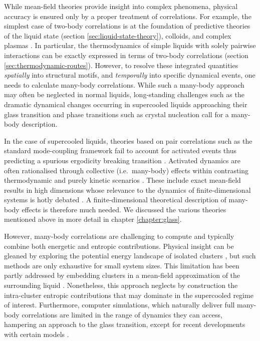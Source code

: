 \documentclass[11pt,twoside]{report}
\begin{document}
While mean-field theories provide insight into complex phenomena, physical accuracy is ensured only by a proper treatment of correlations.
For example, the simplest case of two-body correlations is at the foundation of predictive theories of the liquid state (section \ref{sec:liquid-state-theory}), colloids, and complex plasmas \cite{LikosPR2001,Ivlev2012}.
In particular, the thermodynamics of simple liquids with solely pairwise interactions can be exactly expressed in terms of two-body correlations (section \ref{sec:thermodynamic-routes}).
However, to resolve these integrated quantities \emph{spatially} into structural motifs, and \emph{temporally} into specific dynamical events, one needs to calculate many-body correlations.
While such a many-body approach may often be neglected in normal liquids, long-standing challenges such as the dramatic dynamical changes occurring in supercooled liquids approaching their glass transition \cite{BerthierRMP2011,RoyallPR2015} and phase transitions such as crystal nucleation \cite{RussoSR2012} call for a many-body description.

In the case of supercooled liquids, theories based on pair correlations such as the standard mode-coupling framework \cite{Gotze2009} fail to account for activated events thus predicting a spurious ergodicity breaking transition \cite{BrambillaPRL2009,HallettNC2018}.
Activated dynamics are often rationalised through collective (i.e.\ many-body) effects within contrasting thermodynamic and purely kinetic scenarios \cite{LubchenkoARPC2007,TarjusJPCM2005,BiroliPRL2006,JanssenPRL2015,SzamelPTEP2013,ChandlerARPC2010}.
These include exact mean-field results in high dimensions \cite{ParisiRMP2010,CharbonneauARCMP2017} whose relevance to the dynamics of finite-dimensional systems is hotly debated \cite{WyartPRL2017}.
A finite-dimensional theoretical description of many-body effects is therefore much needed.
We discussed the various theories mentioned above in more detail in chapter \ref{chapter:glass}.

However, many-body correlations are challenging to compute and typically combine both energetic and entropic contributions.
Physical insight can be gleaned by exploring the potential energy landscape of isolated clusters \cite{Wales2004,ArkusPRL2009}, but such methods are only exhaustive for small system sizes.
This limitation has been partly addressed by embedding clusters in a mean-field approximation of the surrounding liquid \cite{MossaJCP2003,MossaJNS2006}.
Nonetheless, this approach neglects by construction the intra-cluster entropic contributions that may dominate in the supercooled regime of interest.
Furthermore, computer simulations, which naturally deliver full many-body correlations are limited in the range of dynamics they can access, hampering an approach to the glass transition, except for recent developments with certain models \cite{BerthierPRL2016}.
\end{document}
